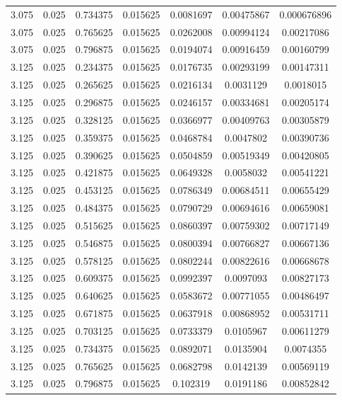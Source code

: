 \begin{table}[bh]
\begin{center}
{\begin{tabular}{ccccccc}
3.075	 & 0.025 & 	0.734375	 & 0.015625	 & 0.0081697	 & 0.00475867	 & 0.000676896 \\ 
3.075	 & 0.025 & 	0.765625	 & 0.015625	 & 0.0262008	 & 0.00994124	 & 0.00217086 \\ 
3.075	 & 0.025 & 	0.796875	 & 0.015625	 & 0.0194074	 & 0.00916459	 & 0.00160799 \\ 
3.125	 & 0.025 & 	0.234375	 & 0.015625	 & 0.0176735	 & 0.00293199	 & 0.00147311 \\ 
3.125	 & 0.025 & 	0.265625	 & 0.015625	 & 0.0216134	 & 0.0031129	 & 0.0018015 \\ 
3.125	 & 0.025 & 	0.296875	 & 0.015625	 & 0.0246157	 & 0.00334681	 & 0.00205174 \\ 
3.125	 & 0.025 & 	0.328125	 & 0.015625	 & 0.0366977	 & 0.00409763	 & 0.00305879 \\ 
3.125	 & 0.025 & 	0.359375	 & 0.015625	 & 0.0468784	 & 0.0047802	 & 0.00390736 \\ 
3.125	 & 0.025 & 	0.390625	 & 0.015625	 & 0.0504859	 & 0.00519349	 & 0.00420805 \\ 
3.125	 & 0.025 & 	0.421875	 & 0.015625	 & 0.0649328	 & 0.0058032	 & 0.00541221 \\ 
3.125	 & 0.025 & 	0.453125	 & 0.015625	 & 0.0786349	 & 0.00684511	 & 0.00655429 \\ 
3.125	 & 0.025 & 	0.484375	 & 0.015625	 & 0.0790729	 & 0.00694616	 & 0.00659081 \\ 
3.125	 & 0.025 & 	0.515625	 & 0.015625	 & 0.0860397	 & 0.00759302	 & 0.00717149 \\ 
3.125	 & 0.025 & 	0.546875	 & 0.015625	 & 0.0800394	 & 0.00766827	 & 0.00667136 \\ 
3.125	 & 0.025 & 	0.578125	 & 0.015625	 & 0.0802244	 & 0.00822616	 & 0.00668678 \\ 
3.125	 & 0.025 & 	0.609375	 & 0.015625	 & 0.0992397	 & 0.0097093	 & 0.00827173 \\ 
3.125	 & 0.025 & 	0.640625	 & 0.015625	 & 0.0583672	 & 0.00771055	 & 0.00486497 \\ 
3.125	 & 0.025 & 	0.671875	 & 0.015625	 & 0.0637918	 & 0.00868952	 & 0.00531711 \\ 
3.125	 & 0.025 & 	0.703125	 & 0.015625	 & 0.0733379	 & 0.0105967	 & 0.00611279 \\ 
3.125	 & 0.025 & 	0.734375	 & 0.015625	 & 0.0892071	 & 0.0135904	 & 0.0074355 \\ 
3.125	 & 0.025 & 	0.765625	 & 0.015625	 & 0.0682798	 & 0.0142139	 & 0.00569119 \\ 
3.125	 & 0.025 & 	0.796875	 & 0.015625	 & 0.102319	 & 0.0191186	 & 0.00852842 \\ 

\end{tabular}}
\end{center}
\end{table}
